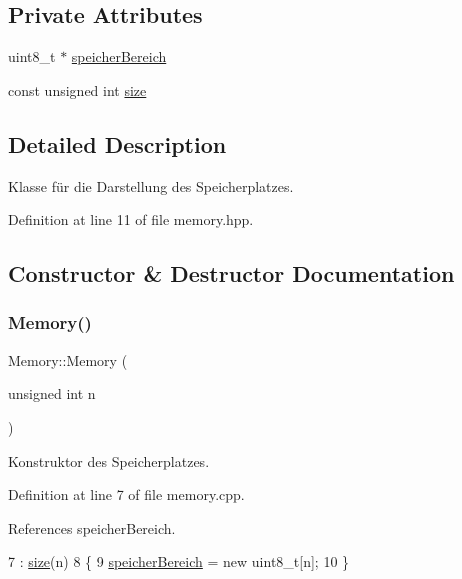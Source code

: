 \subsection*{Private Attributes}
\begin{DoxyCompactItemize}
\item 
uint8\+\_\+t $\ast$ \mbox{\hyperlink{class_memory_a31e171332b705e39bb13e421c7863a5f}{speicher\+Bereich}}
\item 
const unsigned int \mbox{\hyperlink{class_memory_a97e5472d284e8daceeb740acb2170ae0}{size}}
\end{DoxyCompactItemize}


\subsection{Detailed Description}
Klasse für die Darstellung des Speicherplatzes. 

Definition at line 11 of file memory.\+hpp.



\subsection{Constructor \& Destructor Documentation}
\mbox{\label{class_memory_ae9f83eab19db80cb53bf79a5096d05a9}} 
\subsubsection{\texorpdfstring{Memory()}{Memory()}\hspace{0.1cm}{\footnotesize\ttfamily [1/2]}}
{\footnotesize\ttfamily Memory\+::\+Memory (\begin{DoxyParamCaption}\item[{unsigned int}]{n }\end{DoxyParamCaption})}

Konstruktor des Speicherplatzes. 

Definition at line 7 of file memory.\+cpp.



References speicher\+Bereich.


\begin{DoxyCode}
7                              : \mbox{\hyperlink{class_memory_a97e5472d284e8daceeb740acb2170ae0}{size}}(n)
8 \{
9     \mbox{\hyperlink{class_memory_a31e171332b705e39bb13e421c7863a5f}{speicherBereich}} = \textcolor{keyword}{new} uint8\_t[n];
10 \}
\end{DoxyCode}
\mbox{\label{class_memory_a0ffa9759ebbf103f11132a505b93bdc0}} 
